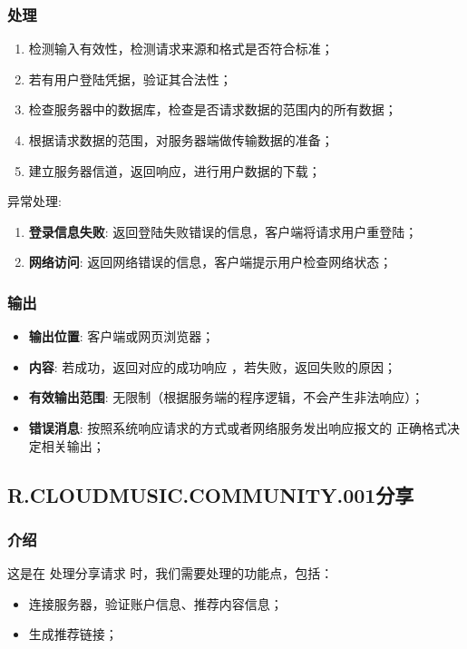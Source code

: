 \subsubsection{处理}
	\begin{enumerate}
		\item 检测输入有效性，检测请求来源和格式是否符合标准；
		\item 若有用户登陆凭据，验证其合法性；
		\item 检查服务器中的数据库，检查是否请求数据的范围内的所有数据；
		\item 根据请求数据的范围，对服务器端做传输数据的准备；
		\item 建立服务器信道，返回响应，进行用户数据的下载；
	\end{enumerate}
	\noindent 异常处理: 
	\begin{enumerate}
		\item \textbf{登录信息失败}: 返回登陆失败错误的信息，客户端将请求用户重登陆；
		\item \textbf{网络访问}: 返回网络错误的信息，客户端提示用户检查网络状态；
	\end{enumerate}
\subsubsection{输出}
\begin{itemize}
	\item \textbf{输出位置}: 客户端或网页浏览器；
	\item \textbf{内容}: 若成功，返回对应的成功响应 ，若失败，返回失败的原因；
	\item \textbf{有效输出范围}: 无限制（根据服务端的程序逻辑，不会产生非法响应）；
	\item \textbf{错误消息}: 按照系统响应请求的方式或者网络服务发出响应报文的
		正确格式决定相关输出；
\end{itemize}


\subsection{R.CLOUDMUSIC.COMMUNITY.001分享}
\subsubsection{介绍}
	这是在 处理分享请求 时，我们需要处理的功能点，包括：
	\begin{itemize}
		\item 连接服务器，验证账户信息、推荐内容信息；
		\item 生成推荐链接；
	\end{itemize}
